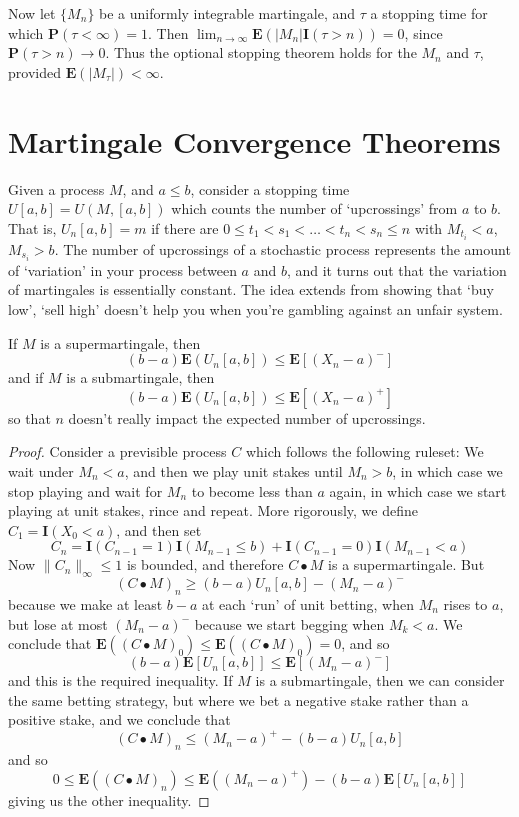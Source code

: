 Now let $\{ M_n \}$ be a uniformly integrable martingale, and $\tau$ a stopping time for which $\mathbf{P}(\tau < \infty) = 1$. Then $\lim_{n \to \infty} \mathbf{E}(|M_n| \mathbf{I}(\tau > n)) = 0$, since $\mathbf{P}(\tau > n) \to 0$. Thus the optional stopping theorem holds for the $M_n$ and $\tau$, provided $\mathbf{E}(|M_\tau|) < \infty$.

\section{Martingale Convergence Theorems}

Given a process $M$, and $a \leq b$, consider a stopping time $U[a,b] = U(M,[a,b])$ which counts the number of `upcrossings' from $a$ to $b$. That is, $U_n[a,b] = m$ if there are $0 \leq t_1 < s_1 < \dots < t_n < s_n \leq n$ with $M_{t_i} < a$, $M_{s_i} > b$. The number of upcrossings of a stochastic process represents the amount of `variation' in your process between $a$ and $b$, and it turns out that the variation of martingales is essentially constant. The idea extends from showing that `buy low', `sell high' doesn't help you when you're gambling against an unfair system.

\begin{theorem}
    If $M$ is a supermartingale, then
    \[ (b-a) \mathbf{E}(U_n[a,b]) \leq \mathbf{E}[(X_n - a)^-] \]
    and if $M$ is a submartingale, then
    \[ (b-a) \mathbf{E}(U_n[a,b]) \leq \mathbf{E}[(X_n - a)^+] \]
    so that $n$ doesn't really impact the expected number of upcrossings.
\end{theorem}
\begin{proof}
    Consider a previsible process $C$ which follows the following ruleset: We wait under $M_n < a$, and then we play unit stakes until $M_n > b$, in which case we stop playing and wait for $M_n$ to become less than $a$ again, in which case we start playing at unit stakes, rince and repeat. More rigorously, we define $C_1 = \mathbf{I}(X_0 < a)$, and then set
    \[ C_n = \mathbf{I}(C_{n-1} = 1) \mathbf{I}(M_{n-1} \leq b) + \mathbf{I}(C_{n-1} = 0) \mathbf{I}(M_{n-1} < a) \]
    Now $\| C_n \|_\infty \leq 1$ is bounded, and therefore $C \bullet M$ is a supermartingale. But
    \[ (C \bullet M)_n \geq (b-a) U_n[a,b] - (M_n - a)^- \]
    because we make at least $b-a$ at each `run' of unit betting, when $M_n$ rises to $a$, but lose at most $(M_n - a)^-$ because we start begging when $M_k < a$. We conclude that $\mathbf{E}((C \bullet M)_0) \leq \mathbf{E}((C \bullet M)_0) = 0$, and so
    \[ (b-a) \mathbf{E}[U_n[a,b]] \leq \mathbf{E}[(M_n - a)^-] \]
    and this is the required inequality. If $M$ is a submartingale, then we can consider the same betting strategy, but where we bet a negative stake rather than a positive stake, and we conclude that
    \[ (C \bullet M)_n \leq (M_n - a)^+ -(b-a) U_n[a,b] \]
    and so
    \[ 0 \leq \mathbf{E}((C \bullet M)_n) \leq \mathbf{E}((M_n - a)^+) - (b-a) \mathbf{E}[U_n[a,b]] \]
    giving us the other inequality.
\end{proof}

